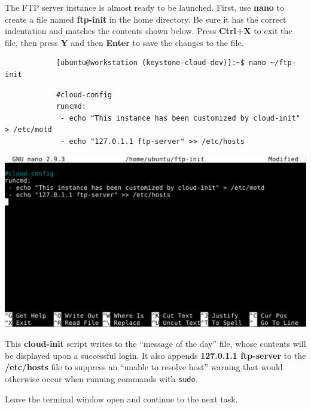\documentclass[letterpaper, 12pt]{article}
\begin{document}
\begin{enumerate}
    \begin{labstep}
        The FTP server instance is almost ready to be launched.
        First, use \textbf{nano} to create a file named \textbf{ftp-init} in the home directory.
        Be sure it has the correct indentation and matches the contents shown below.
        Press \textbf{Ctrl+X} to exit the file, then press \textbf{Y} and then \textbf{Enter} to save the changes to the file.
        \begin{lstlisting}
            [ubuntu@workstation (keystone-cloud-dev)]:~$ nano ~/ftp-init
        \end{lstlisting}
        \begin{lstlisting}
            #cloud-config
            runcmd:
             - echo "This instance has been customized by cloud-init" > /etc/motd
             - echo "127.0.1.1 ftp-server" >> /etc/hosts
        \end{lstlisting}

        \begin{center}
            \includegraphics[width=\linewidth]{images/part1/step42.png}
        \end{center}
    \end{labstep}

    \begin{notebox}
        This \textbf{cloud-init} script writes to the ``message of the day'' file, whose contents will be displayed upon a successful login.
        It also appends \textbf{127.0.1.1 ftp-server} to the \textbf{/etc/hosts} file to suppress an ``unable to resolve host'' warning that would otherwise occur when running commands with \texttt{sudo}.
    \end{notebox}

    \begin{labstep}
        Leave the terminal window open and continue to the next task.
    \end{labstep}
\end{enumerate}
\end{document}
